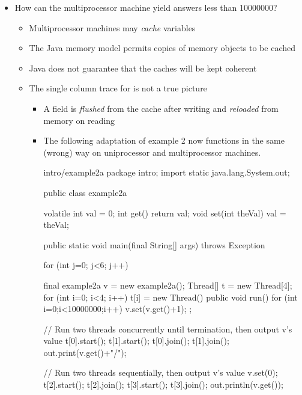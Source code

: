 \documentclass{concdistfoils}
\begin{document}
\begin{slide}
\begin{itemize}
\item How can the multiprocessor machine yield answers less than 10000000?
\begin{itemize}
\item Multiprocessor machines may \textit{cache} variables
\item The Java memory model permits copies of memory objects to be cached
\item Java does not guarantee that the caches will be kept coherent 
\item The single column trace for  is not a true picture
\begin{note}
\begin{itemize}
\item A  field is \textit{flushed} from the cache after writing
      and \textit{reloaded} from memory on reading
\item The following adaptation of example 2 now functions in the same
      (wrong) way on uniprocessor and multiprocessor machines.
\begin{class}{intro/example2a}
package intro;
import static java.lang.System.out;
\end{class}
\begin{class}{}
public class example2a 
{volatile int val = 0;
 int  get()            { return val; }
 void set(int theVal)  { val = theVal;  }
 
 public static void main(final String[] args) throws Exception
 { for (int j=0; j<6; j++) 
   { final example2a v = new example2a();
     Thread[] t = new Thread[4];
     for (int i=0; i<4; i++) 
      t[i] = new Thread()
         { public void run() { for (int i=0;i<10000000;i++) v.set(v.get()+1); } };
     
     // Run two threads concurrently until termination, then output v's value
     t[0].start(); t[1].start(); t[0].join(); t[1].join(); out.print(v.get()+"/");
     
     // Run two threads sequentially, then output v's value
     v.set(0);
     t[2].start(); t[2].join();  t[3].start(); t[3].join(); out.println(v.get());
   }
 }
}
\end{class}
\end{itemize}


\end{note}
\end{itemize}
\end{itemize}
\end{slide}
\end{document}
